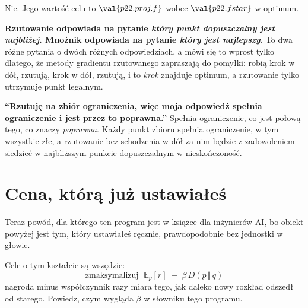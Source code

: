 \begin{fr}
\begin{ansblock}
Nie. Jego wartość celu to $\val{p22.proj.f}$ wobec $\val{p22.fstar}$ w optimum.
\end{ansblock}

\textbf{Rzutowanie odpowiada na pytanie \emph{który punkt dopuszczalny jest
najbliżej}. Mnożnik odpowiada na pytanie \emph{który jest najlepszy}.} To dwa
różne pytania o dwóch różnych odpowiedziach, a mówi się to wprost tylko dlatego,
że metody gradientu rzutowanego zapraszają do pomyłki: robią krok w dół,
rzutują,
krok w dół, rzutują, i to \emph{krok} znajduje optimum, a rzutowanie tylko
utrzymuje punkt legalnym.

\begin{trapbox}
\textbf{\enquote{Rzutuję na zbiór ograniczenia, więc moja odpowiedź spełnia
ograniczenie i jest przez to poprawna.}} Spełnia ograniczenie, co jest połową
tego, co znaczy \emph{poprawna}. Każdy punkt zbioru spełnia ograniczenie, w tym
wszystkie złe, a rzutowanie bez schodzenia w dół za nim będzie z zadowoleniem
siedzieć w najbliższym punkcie dopuszczalnym w nieskończoność.
\end{trapbox}
\end{fr}

\section{Cena, którą już ustawiałeś}
\label{sec:P22-penalty}

\begin{fr}
Teraz powód, dla którego ten program jest w książce dla inżynierów AI, bo obiekt
powyżej jest tym, który ustawiałeś ręcznie, prawdopodobnie bez jednostki w
głowie.

Cele o tym kształcie są wszędzie:
\[ \text{zmaksymalizuj } \;\mathbb{E}_{p}[r] \;-\; \beta \, D(p \,\Vert\, q) \]
nagroda minus współczynnik razy miara tego, jak daleko nowy rozkład odszedł od
starego. Powiedz, czym wygląda $\beta$ w słowniku tego programu.
\dotline
\nextframe
\end{fr}

